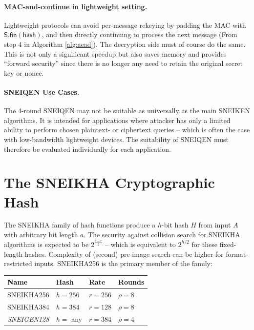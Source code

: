 \documentclass{iacrtrans}
\newcommand{\msf}[1]{\mathsf{#1}}
\begin{document}
	\paragraph{MAC-and-continue in lightweight setting.}
	Lightweight protocols can avoid per-message rekeying by 
	padding the MAC with $\msf{S.fin}( \msf{hash} )$, and then directly 
	continuing to process the next message (From step 4 in Algorithm 
	\ref{alg:aead}). The decryption side must of course do the same. This is 
	not only a significant speedup but also saves memory and provides
	``forward security'' since there is no longer any need to retain the original 
	secret key or nonce.

	\paragraph{SNEIQEN Use Cases.}
	The 4-round SNEIQEN may not be suitable as universally as the main
	SNEIKEN algorithms. It is intended for applications where attacker has
	only a limited ability to perform chosen plaintext- or ciphertext 
	queries -- which is often the case with low-bandwidth lightweight devices.
	The suitability of SNEIQEN must therefore be evaluated individually for
	each application.

	

\section{The SNEIKHA Cryptographic Hash}
\label{sec:sneikha}

	The SNEIKHA family of hash functions produce a $h$-bit hash $H$ from 
	input $A$ with arbitrary bit length $a$. The security against 
	collision search for SNEIKHA algorithms is expected to be 
	$2^{\frac{b-r}{2}}$ -- which is equivalent to $2^{h/2}$ for these 
	fixed-length hashes. Complexity of (second) pre-image search can be higher 
	for format-restricted inputs.
	SNEIKHA256 is the primary member of the family:
	\begin{center}
	\begin{tabular}{x{25mm} x{15mm} x{15mm} x{15mm}}
		{\bf Name} & {\bf Hash} & {\bf Rate} & {\bf Rounds} \\
		\hline
		SNEIKHA256 & $h=256$  & $r=256$ & $\rho=8$ \\
		SNEIKHA384 & $h=384$  & $r=128$ & $\rho=8$ \\
		{\it SNEIGEN128} & $h=$ any & $r=384$ & $\rho=4$ \\
	\end{tabular}
	\end{center}
\end{document}
